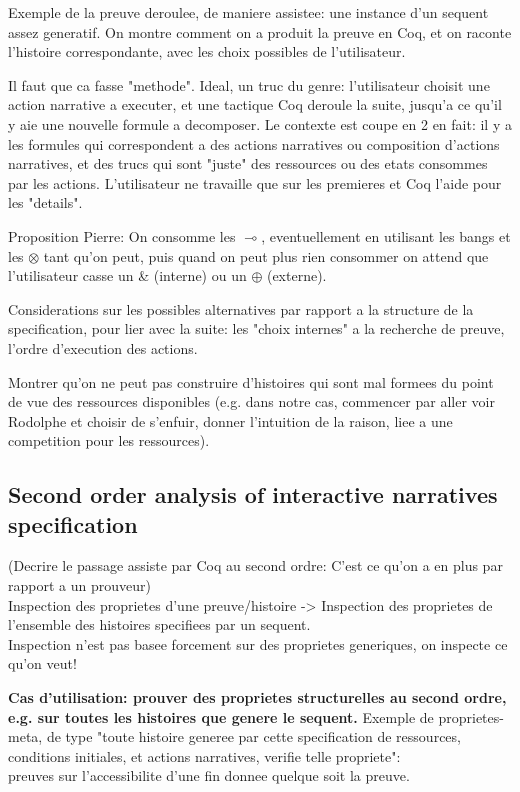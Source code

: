 \documentclass[runningheads,a4paper]{llncs}
\begin{document}
Exemple de la preuve deroulee, de maniere assistee: une instance d'un sequent assez generatif. On montre comment on a produit la preuve en Coq, et on raconte l'histoire correspondante, avec les choix possibles de l'utilisateur. 

Il faut que ca fasse "methode". Ideal, un truc du genre: l'utilisateur
choisit une action narrative a executer, et une tactique Coq deroule
la suite, jusqu'a ce qu'il y aie une nouvelle formule a decomposer. Le
contexte est coupe en 2 en fait: il y a les formules qui correspondent
a des actions narratives ou composition d'actions narratives, et des
trucs qui sont "juste" des ressources ou des etats consommes par les
actions. L'utilisateur ne travaille que sur les premieres et Coq
l'aide pour les "details".

Proposition Pierre: On consomme les $\multimap$, eventuellement en
utilisant les bangs et les $\otimes$ tant qu'on peut, puis quand on
peut plus rien consommer on attend que l'utilisateur casse un \&
(interne) ou un $\oplus$ (externe).

Considerations sur les possibles alternatives par rapport a la structure de la specification, pour lier avec la suite: les "choix internes" a la recherche de preuve, l'ordre d'execution des actions. 

Montrer qu'on ne peut pas construire d'histoires qui sont mal formees du point de vue des ressources disponibles (e.g. dans notre cas, commencer par aller voir Rodolphe et choisir de s'enfuir, donner l'intuition de la raison, liee a une competition pour les ressources).
\subsection{Second order analysis of interactive narratives specification}
\label{sec:second-order-analys}
(Decrire le passage assiste par Coq au second ordre: C'est ce qu'on a en plus par rapport a un prouveur)
\\
Inspection des proprietes d'une preuve/histoire -> Inspection des proprietes de l'ensemble des histoires specifiees par un sequent.\\
Inspection n'est pas basee forcement sur des proprietes generiques, on inspecte ce qu'on veut!

\textbf{Cas d'utilisation: prouver des proprietes structurelles au second ordre, e.g. sur toutes les histoires que genere le sequent.}
Exemple de proprietes-meta, de type "toute histoire generee par cette specification de ressources, conditions initiales, et actions narratives, verifie telle propriete":\\ preuves sur l'accessibilite d'une fin donnee quelque soit la preuve.
\end{document}
